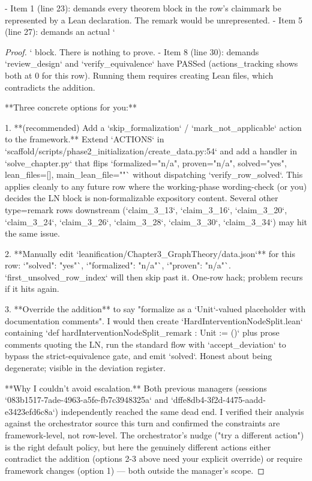 \documentclass[12pt, a4paper]{scrartcl}
\begin{document}
- Item 1 (line 23): demands every theorem block in the row's claimmark be represented by a Lean declaration. The remark would be unrepresented.
- Item 5 (line 27): demands an actual `\begin{proof}` block. There is nothing to prove.
- Item 8 (line 30): demands `review_design` and `verify_equivalence` have PASSed (actions_tracking shows both at 0 for this row). Running them requires creating Lean files, which contradicts the addition.

**Three concrete options for you:**

1. **(recommended) Add a `skip_formalization` / `mark_not_applicable` action to the framework.** Extend `ACTIONS` in `scaffold/scripts/phase2_initialization/create_data.py:54` and add a handler in `solve_chapter.py` that flips `formalized="n/a", proven="n/a", solved="yes", lean_files=[], main_lean_file=""` without dispatching `verify_row_solved`. This applies cleanly to any future row where the working-phase wording-check (or you) decides the LN block is non-formalizable expository content. Several other type=remark rows downstream (`claim_3_13`, `claim_3_16`, `claim_3_20`, `claim_3_24`, `claim_3_26`, `claim_3_28`, `claim_3_30`, `claim_3_34`) may hit the same issue.

2. **Manually edit `leanification/Chapter3_GraphTheory/data.json`** for this row: `"solved": "yes"`, `"formalized": "n/a"`, `"proven": "n/a"`. `first_unsolved_row_index` will then skip past it. One-row hack; problem recurs if it hits again.

3. **Override the addition** to say "formalize as a `Unit`-valued placeholder with documentation comments". I would then create `HardInterventionNodeSplit.lean` containing `def hardInterventionNodeSplit_remark : Unit := ()` plus prose comments quoting the LN, run the standard flow with `accept_deviation` to bypass the strict-equivalence gate, and emit `solved`. Honest about being degenerate; visible in the deviation register.

**Why I couldn't avoid escalation.** Both previous managers (sessions `083b1517-7ade-4963-a5fe-fb7c3948325a` and `dffe8db4-3f2d-4475-aadd-e3423efd6c8a`) independently reached the same dead end. I verified their analysis against the orchestrator source this turn and confirmed the constraints are framework-level, not row-level. The orchestrator's nudge ("try a different action") is the right default policy, but here the genuinely different actions either contradict the addition (options 2-3 above need your explicit override) or require framework changes (option 1) — both outside the manager's scope.


\end{proof}
\end{document}
